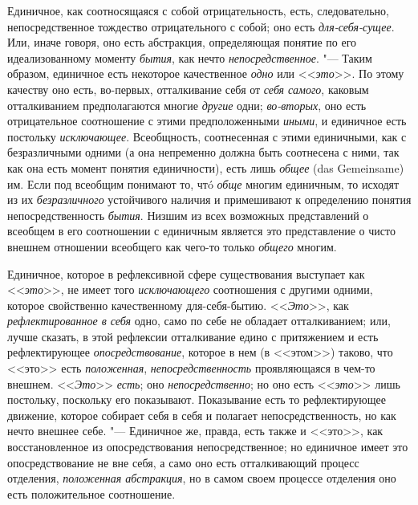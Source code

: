 Единичное, как соотносящаяся с собой отрицательность, есть,
следовательно, непосредственное тождество отрицательного с собой; оно есть
{\em для-себя-сущее}.
Или, иначе говоря, оно есть абстракция, определяющая понятие
по его идеализованному моменту
{\em бытия}, как нечто
{\em непосредственное}. "---
Таким образом, единичное есть некоторое качественное
{\em одно} или
<<{\em это}>>. По этому
качеству оно есть, во-первых, отталкивание себя от
{\em себя самого},
каковым отталкиванием предполагаются многие
{\em другие} одни;
{\em во-вторых},
оно есть отрицательное соотношение с этими предположенными
{\em иными}, и
единичное есть постольку
{\em исключающее}.
Всеобщность, соотнесенная с этими единичными, как с
безразличными одними (а она непременно должна быть соотнесена с ними, так
как она есть момент понятия единичности), есть лишь
{\em общее} (das Gemeinsame)
им. Если под всеобщим понимают то, чтó
{\em обще} многим
единичным, то исходят из их
{\em безразличного}
устойчивого наличия и примешивают к определению понятия
непосредственность {\em бытия}.
Низшим из всех возможных представлений о всеобщем в его
соотношении с единичным является это представление о чисто внешнем
отношении всеобщего как чего-то только {\em общего} многим.

Единичное, которое в рефлексивной сфере существования
выступает как <<{\em это}>>,
не имеет того
{\em исключающего}
соотношения с другими одними, которое свойственно
качественному для-себя-бытию.
<<{\em Это}>>, как
{\em рефлектированное в себя}
одно, само по себе не обладает отталкиванием; или, лучше
сказать, в этой рефлексии отталкивание едино с
притяжением
и есть рефлектирующее
{\em опосредствование},
которое в нем (в <<этом>>) таково, что <<это>> есть {\em положенная},
{\em непосредственность} проявляющаяся в чем-то внешнем. <<{\em Это}>>
{\em есть}; оно
{\em непосредственно}; но
оно есть <<{\em это}>> лишь
постольку, поскольку его показывают. Показывание есть то рефлектирующее
движение, которое собирает себя в себя и полагает непосредственность, но
как нечто внешнее себе. "--- Единичное же,
правда, есть также и <<это>>, как восстановленное из опосредствования
непосредственное; но единичное имеет это опосредствование не вне себя, а
само оно есть отталкивающий процесс отделения,
{\em положенная
абстракция},
но в самом своем процессе отделения оно есть положительное соотношение.

